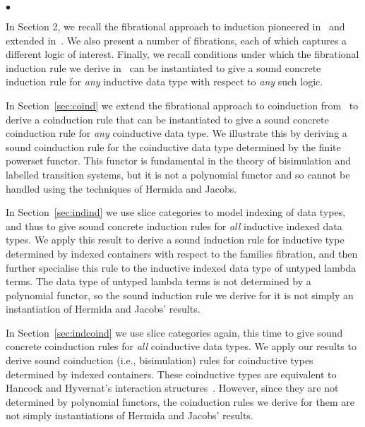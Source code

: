 \documentclass{LMCS}
\theoremstyle{plain}
\theoremstyle{remark}
\theoremstyle{definition}
\begin{document}
\begin{iteMize}{$\bullet$}

\item In Section 2, we recall the fibrational approach to induction
  pioneered in~\cite{hj98} and extended in~\cite{gjf10}. We also
  present a number of fibrations, each of which captures a different
  logic of interest. Finally, we recall conditions under which the
  fibrational induction rule we derive in~\cite{gjf10} can be
  instantiated to give a sound concrete induction rule for {\em any}
  inductive data type with respect to {\em any} such logic.

\item In Section~\ref{sec:coind} we extend the fibrational approach to
  coinduction from~\cite{hj98} to derive a coinduction rule that can
  be instantiated to give a sound concrete coinduction rule for {\em
    any} coinductive data type. We illustrate this by deriving a sound
  coinduction rule for the coinductive data type determined by the
  finite powerset functor. This functor is fundamental in the theory
  of bisimulation and labelled transition systems, but it is not a
  polynomial functor and so cannot be handled using the techniques of
  Hermida and Jacobs.

\item In Section~\ref{sec:indind} we use slice categories to model
  indexing of data types, and thus to give sound concrete induction
  rules for {\em all} inductive indexed data types. We apply this
  result to derive a sound induction rule for inductive type
  determined by indexed containers with respect to the families
  fibration, and then further specialise this rule to the inductive
  indexed data type of untyped lambda terms. The data type of untyped
  lambda terms is not determined by a polynomial functor, so the sound
  induction rule we derive for it is not simply an instantiation of
  Hermida and Jacobs' results.

\item In Section~\ref{sec:indcoind} we use slice categories again,
  this time to give sound concrete coinduction rules for {\em all}
  coinductive data types. We apply our results to derive sound
  coinduction (i.e., bisimulation) rules for coinductive types
  determined by indexed containers. These coinductive types are
  equivalent to Hancock and Hyvernat's interaction
  structures~\cite{hh06}. However, since they are not determined by
  polynomial functors, the coinduction rules we derive for them are
  not simply instantiations of Hermida and Jacobs' results.


\end{iteMize}
\end{document}

